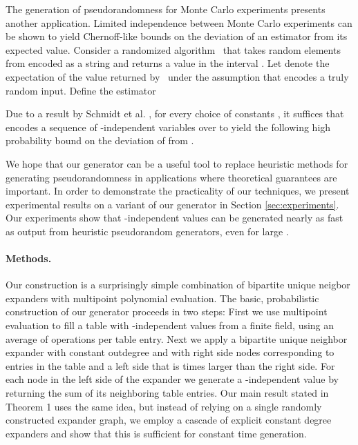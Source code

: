 \documentclass[a4paper,11pt]{article}
\theoremstyle{plain}
\theoremstyle{definition}
\begin{document}
The generation of pseudorandomness for Monte Carlo experiments presents another application.
Limited independence between Monte Carlo experiments can be shown to yield Chernoff-like bounds on the deviation of an estimator from its expected value. 
Consider a randomized algorithm~ that takes  random elements from  encoded as a string  and returns a value in the interval .    
Let  denote the expectation of the value returned by~ under the assumption that  encodes a truly random input.
Define the estimator

Due to a result by Schmidt et al. \cite[Theorem 5]{schmidt1995}, for every choice of constants ,
it suffices that  encodes a sequence of -independent variables over  to yield the following high probability bound on the deviation of  from .

We hope that our generator can be a useful tool to replace heuristic methods for generating pseudorandomness in applications where theoretical guarantees are important. 
In order to demonstrate the practicality of our techniques, we present experimental results on a variant of our generator in Section \ref{sec:experiments}. 
Our experiments show that -independent values can be generated nearly as fast as output from heuristic pseudorandom generators, even for large .

\paragraph{Methods.}
Our construction is a surprisingly simple combination of bipartite unique neigbor expanders with multipoint polynomial evaluation.
The basic, probabilistic construction of our generator proceeds in two steps: 
First we use multipoint evaluation to fill a table with \mbox{-independent} values from a finite field, using an average of  operations per table entry.
Next we apply a bipartite unique neighbor expander with constant outdegree and with right side nodes corresponding to entries in the table and a left side that is  times larger than the right side.
For each node in the left side of the expander we generate a -independent value by returning the sum of its neighboring table entries.
Our main result stated in Theorem 1 uses the same idea, but instead of relying on a single randomly constructed expander graph, 
we employ a cascade of explicit constant degree expanders and show that this is sufficient for constant time generation.   
\end{document}
